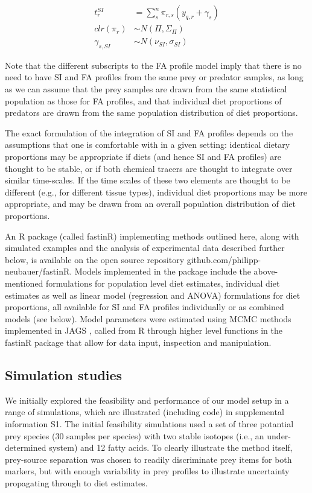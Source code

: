 \documentclass[fleqn,10pt]{wlpeerj}
\begin{document}
\begin{align}
\label{eq:4}
t_{r}^{SI} &=  \sum_{s}^n  \pi_{r,s}  \left(y_{q,r} + \gamma_{s} \right) \\
clr(\pi_{r}) &\sim N(\Pi,\Sigma_{\Pi})\\
\gamma_{s,SI} &\sim N(\nu_{SI},\sigma_{SI})
\end{align}


Note that the different subscripts to the FA profile model imply that there is no need to have SI and
FA profiles from the same prey or predator samples, as long as we can assume that the prey samples are drawn
from the same statistical population as those for FA profiles, and that individual diet proportions of
predators are drawn from the same population distribution of diet
proportions.

The exact formulation of the integration of SI and FA profiles depends on the
assumptions that one is comfortable with in a given setting: identical
dietary proportions may be appropriate if diets (and hence SI and FA profiles)
are thought to be stable, or if both chemical tracers are thought to
integrate over similar time-scales. If the time scales of these two
elements are thought to be different (e.g., for different tissue
types), individual diet proportions may be more
appropriate, and may be drawn from an overall population distribution
of diet proportions. 


An R \citep{R_core_2014}
package (called fastinR) implementing methods outlined here, along with simulated
examples and the analysis of
experimental data described further below, is available on the
open source repository github.com/philipp-neubauer/fastinR. Models
implemented in the package include the above-mentioned formulations
for population level diet estimates, individual diet
estimates  as well as linear model
(regression and ANOVA) formulations for diet proportions, all
available for SI and FA profiles individually or as combined models (see
below). Model parameters were estimated using MCMC methods
implemented in JAGS \citep{plummer_jags_2003}, called
from R through higher level functions in the
fastinR package that allow for data input,
 inspection and manipulation.

\subsection*{Simulation studies}

We initially explored the feasibility and performance of our model setup in a
range of simulations, which are illustrated (including code) in supplemental information S1. The initial feasibility simulations used a set of three potantial prey species (30 samples per species) with two stable isotopes (i.e., an under-determined system) and 12 fatty acids. To clearly illustrate the method itself, prey-source separation was chosen to readily discriminate prey items for both markers, but with enough variability in prey profiles to illustrate uncertainty propagating through to diet estimates.
\end{document}
